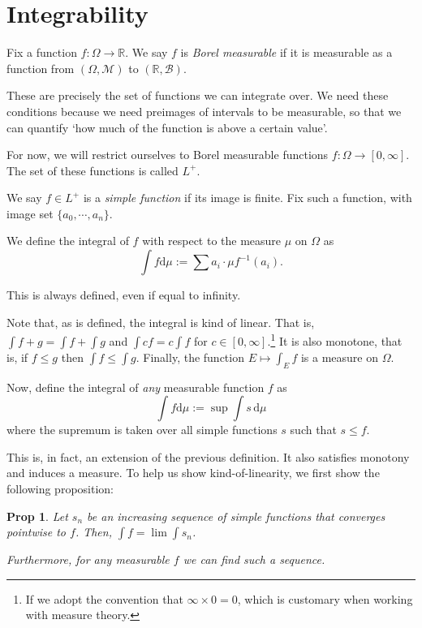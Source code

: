 \documentclass{article}
\newtheorem{prop}{Prop}
\theoremstyle{definition}
\newcommand{\M}{\mathcal{M}}
\newcommand{\B}{\mathcal{B}}
\newcommand{\R}{\mathbb{R}}
\newcommand{\dd}{\mathrm{d}}
\begin{document}
	\section{Integrability}
	
	Fix a function $f : \Omega \to \R$. We say $f$ is \emph{Borel measurable} if it is measurable as a function from $(\Omega, \M)$ to $(\R, \B)$.
	
	These are precisely the set of functions we can integrate over. We need these conditions because we need preimages of intervals to be measurable, so that we can quantify `how much of the function is above a certain value'.
	
	For now, we will restrict ourselves to Borel measurable functions $f : \Omega \to \left[0, \infty\right]$. The set of these functions is called $L^+$.
	
	We say $f \in L^+$ is a \emph{simple function} if its image is finite. Fix such a function, with image set $\{a_0, \cdots, a_n\}$.
	
	We define the integral of $f$ with respect to the measure $\mu$ on $\Omega$ as
	\[ \int f \dd \mu := \sum a_i \cdot \mu f^{-1}(a_i). \]
	
	This is always defined, even if equal to infinity.
	
	Note that, as is defined, the integral is kind of linear. That is, $\int f+g = \int f + \int g$ and $\int cf = c \int f$ for $c \in \left[0, \infty\right]$.\footnote{If we adopt the convention that $\infty \times 0 = 0$, which is customary when working with measure theory.} It is also monotone, that is, if $f \leq g$ then $\int f \leq \int g$. Finally, the function $E \mapsto \int_E f$ is a measure on $\Omega$.

	Now, define the integral of \emph{any} measurable function $f$ as
	\[ \int f \dd \mu := \sup \int s \,\dd \mu\]
	where the supremum is taken over all simple functions $s$ such that $s \leq f$.
	
	This is, in fact, an extension of the previous definition. It also satisfies monotony and induces a measure. To help us show kind-of-linearity, we first show the following proposition:
	
	\begin{prop}
	Let $s_n$ be an increasing sequence of simple functions that converges pointwise to $f$. Then, $\int f = \lim \int s_n$.
	
	Furthermore, for any measurable $f$ we can find such a sequence.
	\end{prop}
	
\end{document}
